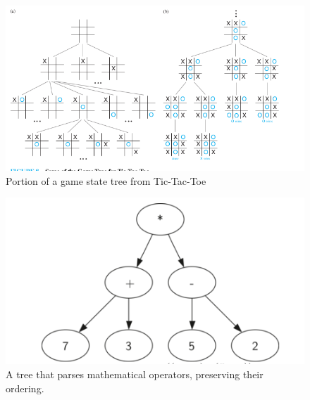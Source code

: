 \documentclass[a4paper,10pt]{article}
\begin{document}
\begin{figure}[H]
	\begin{centering}
	\begin{center}
	\includegraphics[width=\linewidth]{./Pictures/game_states.png}
	\caption{Portion of a game state tree from Tic-Tac-Toe}
	\label{fig:game_state}
	\end{center}
	\par\end{centering}
\end{figure}

\begin{figure}[H]
	\begin{centering}
	\begin{center}
	\includegraphics[width=\linewidth]{./Pictures/parse_tree.png}
	\caption{A tree that parses mathematical operators, preserving their ordering.}
	\label{fig:parse}
	\end{center}
	\par\end{centering}
\end{figure}
\end{document}
